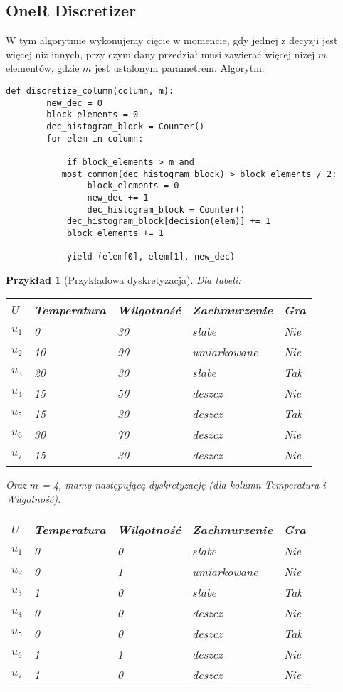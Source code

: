 \documentclass[magisterska]{pracamgr}
\theoremstyle{plain}
\newtheorem{przyklad}[thm]{Przykład}
\theoremstyle{definition}
\theoremstyle{remark}
\begin{document}
\subsection{OneR Discretizer}
W tym algorytmie wykonujemy cięcie w momencie, gdy
jednej z decyzji jest więcej niż innych, przy czym dany przedział musi zawierać więcej niżej
$m$ elementów, gdzie $m$ jest ustalonym parametrem.
Algorytm:
\begin{lstlisting}
def discretize_column(column, m):
        new_dec = 0
        block_elements = 0
        dec_histogram_block = Counter()
        for elem in column:

            if block_elements > m and
	       most_common(dec_histogram_block) > block_elements / 2:
                block_elements = 0
                new_dec += 1
                dec_histogram_block = Counter()
            dec_histogram_block[decision(elem)] += 1
            block_elements += 1

            yield (elem[0], elem[1], new_dec)
\end{lstlisting}
\begin{przyklad}[Przykładowa dyskretyzacja]
Dla tabeli:
\begin{center}
 \begin{tabular}{l || P{2.5cm} P{2.5cm} P{2.5cm} | P{1.5cm}}
  $U$     & Temperatura & Wilgotność & Zachmurzenie & Gra \\ 
  \hline
  $u_{1}$ & 0      & 30      & słabe          & Nie \\
  $u_{2}$ & 10     & 90      & umiarkowane    & Nie \\
  $u_{3}$ & 20     & 30      & słabe   	      & Tak \\
  $u_{4}$ & 15     & 50      & deszcz         & Nie \\
  $u_{5}$ & 15     & 30      & deszcz         & Tak \\
  $u_{6}$ & 30     & 70      & deszcz         & Nie \\
  $u_{7}$ & 15     & 30      & deszcz         & Nie \\
 \end{tabular}
\end{center}
Oraz $m$ = 4, mamy następującą dyskretyzację (dla kolumn Temperatura i Wilgotność):
\begin{center}
 \begin{tabular}{l || P{2.5cm} P{2.5cm} P{2.5cm} | P{1.5cm}}
  $U$     & Temperatura & Wilgotność & Zachmurzenie & Gra \\ 
  \hline
  $u_{1}$ & 0     & 0      & słabe          & Nie \\
  $u_{2}$ & 0     & 1      & umiarkowane    & Nie \\
  $u_{3}$ & 1     & 0      & słabe   	    & Tak \\
  $u_{4}$ & 0     & 0      & deszcz         & Nie \\
  $u_{5}$ & 0     & 0      & deszcz         & Tak \\
  $u_{6}$ & 1     & 1      & deszcz         & Nie \\
  $u_{7}$ & 1     & 0      & deszcz         & Nie \\
 \end{tabular}
\end{center}
\end{przyklad}
\end{document}
